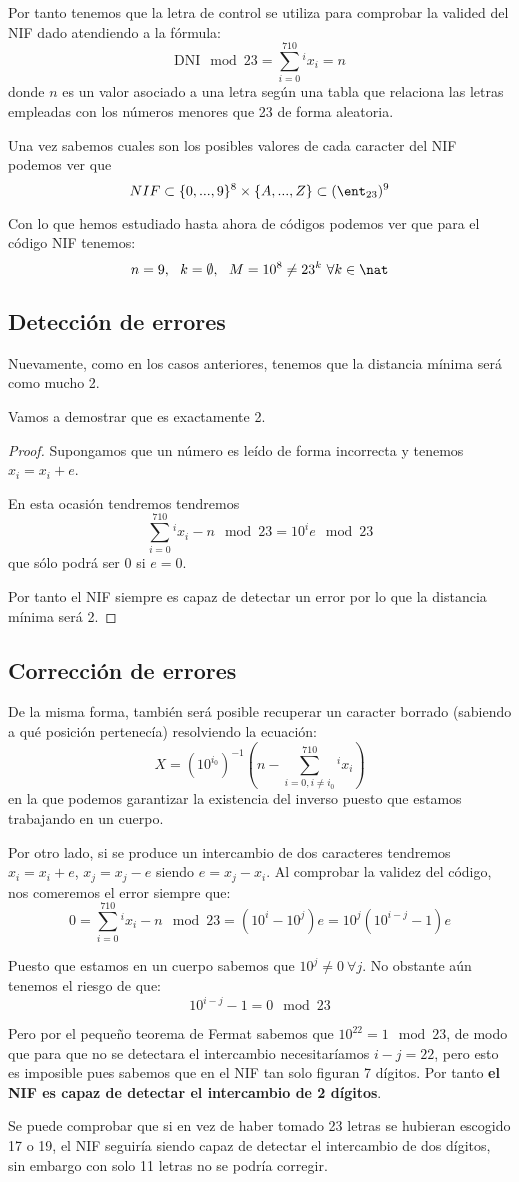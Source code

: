 Por tanto tenemos que la letra de control se utiliza para comprobar la valided del NIF dado atendiendo a la fórmula:
\[\text{DNI}\mod 23 = \sum_{i=0}^710^{i}x_i= n\]
donde $n$ es un valor asociado a una letra según una tabla que relaciona las letras empleadas con los números menores que 23 de forma aleatoria.

Una vez sabemos cuales son los posibles valores de cada caracter del NIF podemos ver que
\[NIF \subset \{0,...,9\}^8 \times \{A,...,Z\} \subset (\ent_{23})^9\]

Con lo que hemos estudiado hasta ahora de códigos podemos ver que para el código NIF tenemos:
\[n=9, \ \ k=\emptyset, \ \ M = 10^{8}\neq 23^k \ \forall k \in \nat\]

\subsection{Detección de errores}
Nuevamente, como en los casos anteriores, tenemos que la distancia mínima será como mucho 2.

Vamos a demostrar que es exactamente 2.
\begin{proof}
Supongamos que un número es leído de forma incorrecta y tenemos $x_i=x_i+e$.

En esta ocasión tendremos tendremos
\[\sum_{i=0}^710^{i}x_i - n \mod 23 = 10^{i} e \mod 23\]
que sólo podrá ser 0 si $e=0$.

Por tanto el NIF siempre es capaz de detectar un error por lo que la distancia mínima será 2.
\end{proof}

\subsection{Corrección de errores}
De la misma forma, también será posible recuperar un caracter borrado (sabiendo a qué posición pertenecía) resolviendo la ecuación:
\[X=(10^{i_0})^{-1} \left( n- \sum_{i=0,i\neq i_0}^710^{i}x_i \right)\]
en la que podemos garantizar la existencia del inverso puesto que estamos trabajando en un cuerpo.

Por otro lado, si se produce un intercambio de dos caracteres tendremos $x_i=x_i+e$, $x_j=x_j-e$ siendo $e=x_j-x_i$. Al comprobar la validez del código, nos comeremos el error siempre que:
\[0 = \sum_{i=0}^710^{i}x_i - n \mod 23 =(10^i-10^j)e = 10^j(10^{i-j}-1)e\]

Puesto que estamos en un cuerpo sabemos que $10^j\neq 0 \ \forall j$. No obstante aún tenemos el riesgo de que:
\[10^{i-j}-1 = 0 \mod 23\]

Pero por el pequeño teorema de Fermat sabemos que $10^{22}=1 \mod 23$, de modo que para que no se detectara el intercambio necesitaríamos $i-j=22$, pero esto es imposible pues sabemos que en el NIF tan solo figuran 7 dígitos. Por tanto \textbf{el NIF es capaz de detectar el intercambio de 2 dígitos}.

\obs Se puede comprobar que si en vez de haber tomado 23 letras se hubieran escogido 17 o 19, el NIF seguiría siendo capaz de detectar el intercambio de dos dígitos, sin embargo con solo 11 letras no se podría corregir.

